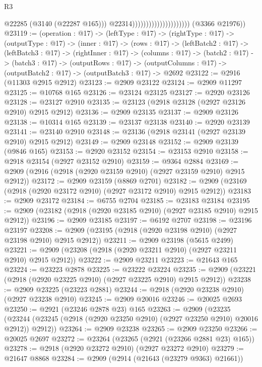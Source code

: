 \begin{lexlean}{R3}
\begin{coremodule}
                                                  @22285
                                                  (@3140 (@22287 @165)))
                                                @22314)))))))))))))))))))))
      (@3366 @21976))
@23119 := (operation : @17) ->
  (leftType : @17) ->
  (rightType : @17) ->
  (outputType : @17) ->
  (inner : @17) ->
  (rows : @17) ->
  (leftBatch2 : @17) ->
  (leftBatch3 : @17) ->
  (rightInner : @17) ->
  (columns : @17) ->
  (batch2 : @17) ->
  (batch3 : @17) ->
  (outputRows : @17) ->
  (outputColumns : @17) -> (outputBatch2 : @17) -> (outputBatch3 : @17) -> @2692
@23122 := @2916 (@11303 @2915 @2912)
@23123 := @2909 @23122
@23124 := @2909 @11297
@23125 := @10768 @165
@23126 := @23124 @23125
@23127 := @2920 @23126
@23128 := @23127 @2910
@23135 := @23123 (@2918 @23128 (@2927 @23126 @2910) @2915 @2912)
@23136 := @2909 @23135
@23137 := @2909 @23126
@23138 := @10314 @165
@23139 := @23137 @23138
@23140 := @2920 @23139
@23141 := @23140 @2910
@23148 := @23136 (@2918 @23141 (@2927 @23139 @2910) @2915 @2912)
@23149 := @2909 @23148
@23152 := @2909 @23139 (@9846 @165)
@23153 := @2920 @23152
@23154 := @23153 @2910
@23158 := @2918 @23154 (@2927 @23152 @2910)
@23159 := @9364 @2884
@23169 := @2909 (@2916 (@2918 (@2920 @23159 @2910) (@2927 @23159 @2910) @2915 @2912))
@23172 := @2909 @23159 (@8869 @2701)
@23182 := @2909 (@23169 (@2918 (@2920 @23172 @2910) (@2927 @23172 @2910) @2915 @2912))
@23183 := @2909 @23172
@23184 := @6755 @2704
@23185 := @23183 @23184
@23195 := @2909 (@23182 (@2918 (@2920 @23185 @2910) (@2927 @23185 @2910) @2915 @2912))
@23196 := @2909 @23185
@23197 := @6192 @2707
@23198 := @23196 @23197
@23208 := @2909 (@23195 (@2918 (@2920 @23198 @2910) (@2927 @23198 @2910) @2915 @2912))
@23211 := @2909 @23198 (@5615 @2499)
@23221 := @2909 (@23208 (@2918 (@2920 @23211 @2910) (@2927 @23211 @2910) @2915 @2912))
@23222 := @2909 @23211
@23223 := @21643 @165
@23224 := @23223 @2878
@23225 := @23222 @23224
@23235 := @2909 (@23221 (@2918 (@2920 @23225 @2910) (@2927 @23225 @2910) @2915 @2912))
@23238 := @2909 @23225 (@23223 @2881)
@23244 := @2918 (@2920 @23238 @2910) (@2927 @23238 @2910)
@23245 := @2909 @20016
@23246 := @20025 @2693
@23250 := @2921 (@23246 @2878 @23) @165
@23263 := @2909
    (@23235 (@23244 (@23245 (@2918 (@2920 @23250 @2910) (@2927 @23250 @2910) @20016 @2912)) @2912))
@23264 := @2909 @23238
@23265 := @2909 @23250
@23266 := @20025 @2697
@23272 := @23264 (@23265 (@2921 (@23266 @2881 @23) @165))
@23278 := @2918 (@2920 @23272 @2910) (@2927 @23272 @2910)
@23279 := @21647 @8868
@23284 := @2909 (@2914 (@21643 (@23279 @9363) @21661))

\end{coremodule}
\end{lexlean}
